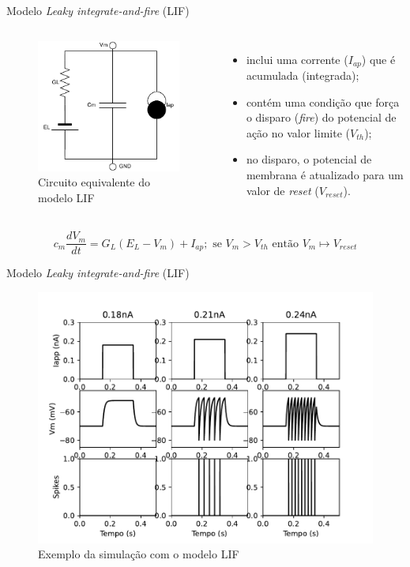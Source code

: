 \begin{frame}{Modelo \textit{Leaky integrate-and-fire} (LIF)}
	\begin{columns}[t]
		\column{5cm}
			\begin{figure}[htb!]
				\centering
				\caption{Circuito equivalente do modelo LIF}
				\label{fig:circuitolif}
				\includegraphics[width=0.8\linewidth]{figs/circuito_lif}
			\end{figure}
		\column{5cm}
			\begin{itemize}
				\item inclui uma corrente ($I_{ap}$) que é acumulada (integrada);
				\item contém uma condição que força o disparo (\textit{fire}) do potencial de ação no valor limite ($V_{th}$);
				\item no disparo, o potencial de membrana é atualizado para um valor de \textit{reset} ($V_{reset}$).
			\end{itemize}
	\end{columns}
	\vfill
	\[
		c_m\frac{dV_m}{dt} = G_L(E_L-V_m)+I_{ap}; \text{ se } V_m > V_{th} \text{ então } V_m\mapsto V_{reset}
	\]
\end{frame}

\begin{frame}{Modelo \textit{Leaky integrate-and-fire} (LIF)}
	\begin{figure}
		\centering
		\caption{Exemplo da simulação com o modelo LIF}
		\label{fig:lif}
		\includegraphics[width=0.5\linewidth]{figs/lif}
	\end{figure}
\end{frame}

